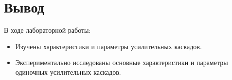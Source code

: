 \section{Вывод}
В ходе лабораторной работы:
\begin{itemize}

\item
Изучены характеристики и параметры усилительных каскадов.

\item
 Экспериментально исследованы основные характеристики и параметры одиночных усилительных каскадов.

\end{itemize}
\clearpage
